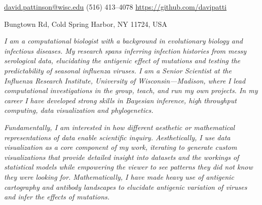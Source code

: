 \documentclass[10pt,a4paper]{article}
\begin{document}
\sloppy  %


\nobreakvspace{0.3em}  %

\noindent\href{mailto:david.pattinson@wisc.edu}{david.pattinson\mbox{}@\mbox{}wisc.edu}\sbull
{} (516) 413--4078\sbull
\href{https://github.com/davipatti}{https://github.com/davipatti}
\par {} Bungtown Rd, Cold Spring Harbor, NY 11724, USA

\spacedhrule{0.5em}{-0.4em}  %

 \begin{multicols}{2} 

  \emph{ I am a computational biologist with a background in evolutionary biology and
  infectious diseases. My research spans inferring infection histories from messy
  serological data, elucidating the antigenic effect of mutations and testing the
  predictability of seasonal influenza viruses. I am a Senior Scientist at the Influenza
  Research Institute, University of Wisconsin---Madison, where I lead computational
  investigations in the group, teach, and run my own projects. In my career I have
  developed strong skills in Bayesian inference, high throughput computing, data
  visualization and phylogenetics. }
  
  \emph{ Fundamentally, I am interested in how different aesthetic or mathematical
  representations of data enable scientific inquiry. Aesthetically, I use data
  visualization as a core component of my work, iterating to generate custom
  visualizations that provide detailed insight into datasets and the workings of
  statistical models while empowering the viewer to see patterns they did not know they
  were looking for. Mathematically, I have made heavy use of antigenic cartography and
  antibody landscapes to elucidate antigenic variation of viruses and infer the effects
  of mutations. }
\end{multicols}

\spacedhrule{0.9em}{-0.4em}

\end{document}
